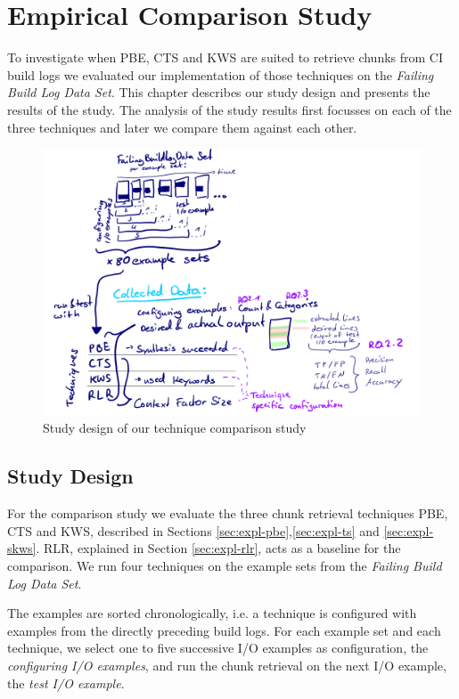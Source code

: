 \documentclass[\myrootdir/main.tex]{subfiles}
\begin{document}
\chapter{Empirical Comparison Study}
\label{sec:study}
To investigate when PBE, CTS and KWS are suited to retrieve chunks from CI build logs we evaluated our implementation of those techniques on the \emph{Failing Build Log Data Set}.
This chapter describes our study design and presents the results of the study.
The analysis of the study results first focusses on each of the three techniques and later we compare them against each other.


\begin{figure}[htbp]
	\centering
	\includegraphics[width=\textwidth, clip]{img/study-design.pdf}
	\caption{Study design of our technique comparison study}
	\label{fig:study}
\end{figure}

\section{Study Design}
For the comparison study we evaluate the three chunk retrieval techniques PBE, CTS and KWS, described in Sections \ref{sec:expl-pbe},\ref{sec:expl-ts} and \ref{sec:expl-skws}.
RLR, explained in Section \ref{sec:expl-rlr}, acts as a baseline for the comparison.
We run four techniques on the example sets from the \emph{Failing Build Log Data Set}.

The examples are sorted chronologically, i.e. a technique is configured with examples from the directly preceding build logs.
For each example set and each technique, we select one to five successive I/O examples as configuration, the \emph{configuring I/O examples}, and run the chunk retrieval on the next I/O example, the \emph{test I/O example}.
\end{document}
